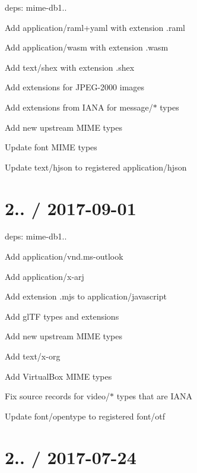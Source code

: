 \begin{DoxyItemize}
\item deps\+: mime-\/db1..
\begin{DoxyItemize}
\item Add {\ttfamily application/raml+yaml} with extension {\ttfamily .raml}
\item Add {\ttfamily application/wasm} with extension {\ttfamily .wasm}
\item Add {\ttfamily text/shex} with extension {\ttfamily .shex}
\item Add extensions for J\+P\+E\+G-\/2000 images
\item Add extensions from I\+A\+NA for {\ttfamily message/$\ast$} types
\item Add new upstream M\+I\+ME types
\item Update font M\+I\+ME types
\item Update {\ttfamily text/hjson} to registered {\ttfamily application/hjson}
\end{DoxyItemize}
\end{DoxyItemize}

\section*{2.. / 2017-\/09-\/01 }


\begin{DoxyItemize}
\item deps\+: mime-\/db1..
\begin{DoxyItemize}
\item Add {\ttfamily application/vnd.\+ms-\/outlook}
\item Add {\ttfamily application/x-\/arj}
\item Add extension {\ttfamily .mjs} to {\ttfamily application/javascript}
\item Add gl\+TF types and extensions
\item Add new upstream M\+I\+ME types
\item Add {\ttfamily text/x-\/org}
\item Add Virtual\+Box M\+I\+ME types
\item Fix {\ttfamily source} records for {\ttfamily video/$\ast$} types that are I\+A\+NA
\item Update {\ttfamily font/opentype} to registered {\ttfamily font/otf}
\end{DoxyItemize}
\end{DoxyItemize}

\section*{2.. / 2017-\/07-\/24 }


